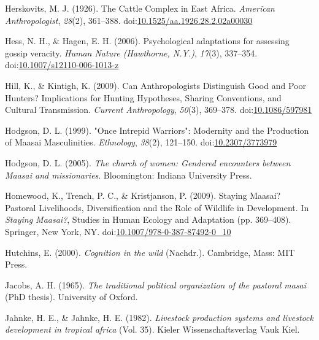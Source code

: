 \documentclass[
  11pt,
]{article}
\begin{document}
\leavevmode\hypertarget{ref-herskovitsCattleComplexEast1926a}{}%
Herskovits, M. J. (1926). The Cattle Complex in East Africa.
\emph{American Anthropologist}, \emph{28}(2), 361--388.
doi:\href{https://doi.org/10.1525/aa.1926.28.2.02a00030}{10.1525/aa.1926.28.2.02a00030}

\leavevmode\hypertarget{ref-hessPsychologicalAdaptationsAssessing2006a}{}%
Hess, N. H., \& Hagen, E. H. (2006). Psychological adaptations for
assessing gossip veracity. \emph{Human Nature (Hawthorne, N.Y.)},
\emph{17}(3), 337--354.
doi:\href{https://doi.org/10.1007/s12110-006-1013-z}{10.1007/s12110-006-1013-z}

\leavevmode\hypertarget{ref-hillCanAnthropologistsDistinguish2009}{}%
Hill, K., \& Kintigh, K. (2009). Can Anthropologists Distinguish Good
and Poor Hunters? Implications for Hunting Hypotheses, Sharing
Conventions, and Cultural Transmission. \emph{Current Anthropology},
\emph{50}(3), 369--378.
doi:\href{https://doi.org/10.1086/597981}{10.1086/597981}

\leavevmode\hypertarget{ref-hodgsonOnceIntrepidWarriors1999}{}%
Hodgson, D. L. (1999). "Once Intrepid Warriors": Modernity and the
Production of Maasai Masculinities. \emph{Ethnology}, \emph{38}(2),
121--150. doi:\href{https://doi.org/10.2307/3773979}{10.2307/3773979}

\leavevmode\hypertarget{ref-hodgsonChurchWomenGendered2005}{}%
Hodgson, D. L. (2005). \emph{The church of women: Gendered encounters
between Maasai and missionaries}. Bloomington: Indiana University Press.

\leavevmode\hypertarget{ref-homewoodStayingMaasaiPastoral2009}{}%
Homewood, K., Trench, P. C., \& Kristjanson, P. (2009). Staying Maasai?
Pastoral Livelihoods, Diversification and the Role of Wildlife in
Development. In \emph{Staying Maasai?}, Studies in Human Ecology and
Adaptation (pp. 369--408). Springer, New York, NY.
doi:\href{https://doi.org/10.1007/978-0-387-87492-0_10}{10.1007/978-0-387-87492-0\_10}

\leavevmode\hypertarget{ref-hutchinsCognitionWild2000}{}%
Hutchins, E. (2000). \emph{Cognition in the wild} (Nachdr.). Cambridge,
Mass: MIT Press.

\leavevmode\hypertarget{ref-jacobs1965traditional}{}%
Jacobs, A. H. (1965). \emph{The traditional political organization of
the pastoral masai} (PhD thesis). University of Oxford.

\leavevmode\hypertarget{ref-jahnke1982livestock}{}%
Jahnke, H. E., \& Jahnke, H. E. (1982). \emph{Livestock production
systems and livestock development in tropical africa} (Vol. 35). Kieler
Wissenschaftsverlag Vauk Kiel.
\end{document}
